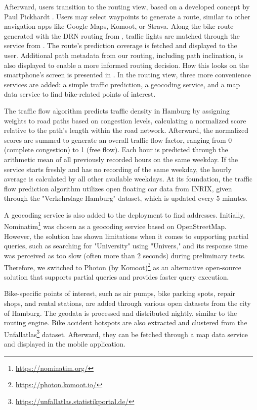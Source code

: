 Afterward, users transition to the routing view, based on a developed concept by Paul Pickhardt \cite{pickhardt_2022}. Users may select waypoints to generate a route, similar to other navigation apps like Google Maps, Komoot, or Strava. Along the bike route generated with the DRN routing from , traffic lights are matched through the service from . The route's prediction coverage is fetched and displayed to the user. Additional path metadata from our routing, including path inclination, is also displayed to enable a more informed routing decision. How this looks on the smartphone's screen is presented in . In the routing view, three more convenience services are added: a simple traffic prediction, a geocoding service, and a map data service to find bike-related points of interest.

The traffic flow algorithm predicts traffic density in Hamburg by assigning weights to road paths based on congestion levels, calculating a normalized score relative to the path's length within the road network. Afterward, the normalized scores are summed to generate an overall traffic flow factor, ranging from 0 (complete congestion) to 1 (free flow). Each hour is predicted through the arithmetic mean of all previously recorded hours on the same weekday. If the service starts freshly and has no recording of the same weekday, the hourly average is calculated by all other available weekdays. At its foundation, the traffic flow prediction algorithm utilizes open floating car data from INRIX, given through the "Verkehrslage Hamburg" dataset, which is updated every 5 minutes.

A geocoding service is also added to the deployment to find addresses. Initially, Nominatim\footnote{\url{https://nominatim.org/}} was chosen as a geocoding service based on OpenStreetMap. However, the solution has shown limitations when it comes to supporting partial queries, such as searching for "University" using "Univers," and its response time was perceived as too slow (often more than 2 seconds) during preliminary tests. Therefore, we switched to Photon (by Komoot)\footnote{\url{https://photon.komoot.io/}} as an alternative open-source solution that supports partial queries and provides faster query execution.

Bike-specific points of interest, such as air pumps, bike parking spots, repair shops, and rental stations, are added through various open datasets from the city of Hamburg. The geodata is processed and distributed nightly, similar to the routing engine. Bike accident hotspots are also extracted and clustered from the Unfallatlas\footnote{\url{https://unfallatlas.statistikportal.de/}} dataset. Afterward, they can be fetched through a map data service and displayed in the mobile application.

